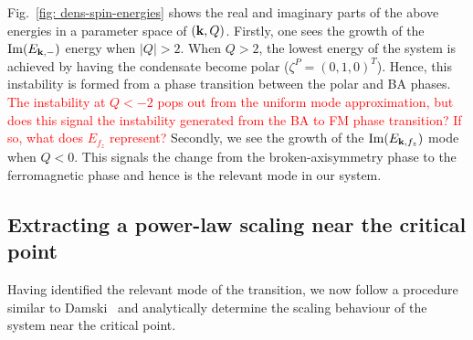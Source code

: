 Fig.~\ref{fig: dens-spin-energies} shows the real and imaginary parts of the
above energies in a parameter space of \( (\vb{k}, Q) \).
Firstly, one sees the growth of the \( \mathrm{Im}(E_{\vb{k}, -}) \) energy
when \( |Q| > 2 \).
When \( Q>2 \), the lowest energy of the system is achieved by having the
condensate become polar (\( \zeta^P={(0,1,0)}^T \)).
Hence, this instability is formed from a phase transition between the polar
and BA phases.
\textcolor{red}{The instability at \( Q < -2 \) pops out from the uniform mode
    approximation, but does this signal the instability generated from the BA
    to FM phase transition? If so, what does \( E_{f_{z}} \) represent?}
Secondly, we see the growth of the \( \mathrm{Im}(E_{\vb{k}, {f_z}}) \) mode
when \( Q<0 \).
This signals the change from the broken-axisymmetry phase to the ferromagnetic
phase and hence is the relevant mode in our system.

\subsection{Extracting a power-law scaling near the critical point}
Having identified the relevant mode of the transition, we now follow a procedure
similar to Damski~\cite{Damski2007} and analytically determine the scaling
behaviour of the system near the critical point.

